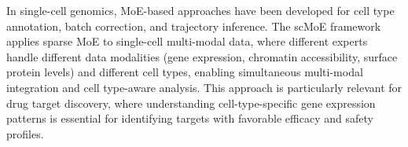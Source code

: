 In single-cell genomics, MoE-based approaches have been developed for cell type annotation, batch correction, and trajectory inference. The scMoE framework \cite{yun2024scmoe} applies sparse MoE to single-cell multi-modal data, where different experts handle different data modalities (gene expression, chromatin accessibility, surface protein levels) and different cell types, enabling simultaneous multi-modal integration and cell type-aware analysis. This approach is particularly relevant for drug target discovery, where understanding cell-type-specific gene expression patterns is essential for identifying targets with favorable efficacy and safety profiles.
